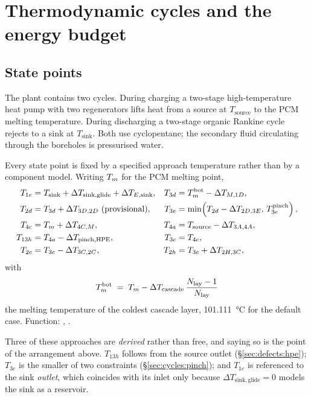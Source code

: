 \section{Thermodynamic cycles and the energy budget}
\label{sec:cycles}

\subsection{State points}
\label{sec:cycles:states}

The plant contains two cycles. During charging a two-stage high-temperature heat
pump with two regenerators lifts heat from a source at $T_{\mathrm{source}}$ to
the PCM melting temperature. During discharging a two-stage organic Rankine
cycle rejects to a sink at $T_{\mathrm{sink}}$. Both use cyclopentane; the
secondary fluid circulating through the boreholes is pressurised water.

Every state point is fixed by a specified approach temperature rather than by a
component model. Writing $T_{m}$ for the PCM melting point,
\begin{align}
  T_{1e} &= T_{\mathrm{sink}} + \Delta T_{\mathrm{sink,glide}}
            + \Delta T_{E,\mathrm{sink}}, &
  T_{3d} &= T_{m}^{\mathrm{bot}} - \Delta T_{M,1D}, \\
  T_{2d} &= T_{3d} + \Delta T_{3D,2D}\ \text{(provisional)}, &
  T_{3e} &= \min\!\left(T_{2d}-\Delta T_{2D,3E},\,
                        T_{3e}^{\mathrm{pinch}}\right), \\
  T_{4c} &= T_{m} + \Delta T_{4C,M}, &
  T_{4a} &= T_{\mathrm{source}} - \Delta T_{3A,4A}, \\
  T_{13h} &= T_{4a} - \Delta T_{\mathrm{pinch,HPE}}, &
  T_{3c} &= T_{4c}, \\
  T_{2c} &= T_{3c} - \Delta T_{3C,2C}, &
  T_{2h} &= T_{3c} + \Delta T_{2H,3C},
\end{align}
with
\begin{equation}
  T_{m}^{\mathrm{bot}} \;=\; T_{m} - \Delta T_{\mathrm{cascade}}\,
  \frac{N_{\mathrm{lay}}-1}{N_{\mathrm{lay}}}
  \label{eq:Tmbot}
\end{equation}
the melting temperature of the coldest cascade layer, \SI{101.111}{\celsius} for
the default case. Function: , .

Three of these approaches are \emph{derived} rather than free, and saying so is
the point of the arrangement above. $T_{13h}$ follows from the source outlet
(\S\ref{sec:defects:hpe}); $T_{3e}$ is the smaller of two constraints
(\S\ref{sec:cycles:pinch}); and $T_{1e}$ is referenced to the sink
\emph{outlet}, which coincides with its inlet only because
$\Delta T_{\mathrm{sink,glide}}=0$ models the sink as a reservoir.

